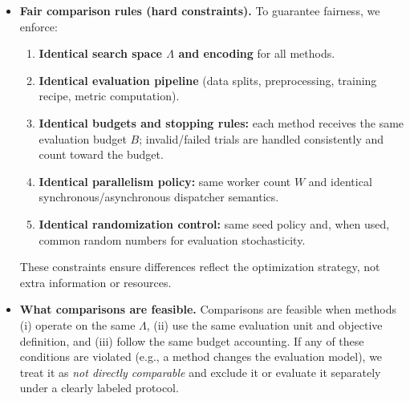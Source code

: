 \begin{itemize}
    \item \textbf{Fair comparison rules (hard constraints).}
    To guarantee fairness, we enforce:
    \begin{enumerate}
        \item \textbf{Identical search space \(\Lambda\) and encoding} for all methods.
        \item \textbf{Identical evaluation pipeline} (data splits, preprocessing, training recipe, metric computation).
        \item \textbf{Identical budgets and stopping rules:} each method receives the same evaluation budget \(B\);
        invalid/failed trials are handled consistently and count toward the budget.
        \item \textbf{Identical parallelism policy:} same worker count \(W\) and identical synchronous/asynchronous dispatcher semantics.
        \item \textbf{Identical randomization control:} same seed policy and, when used, common random numbers for evaluation stochasticity.
    \end{enumerate}
    These constraints ensure differences reflect the optimization strategy, not extra information or resources.

    \item \textbf{What comparisons are feasible.}
    Comparisons are feasible when methods (i) operate on the same \(\Lambda\), (ii) use the same evaluation unit and objective definition,
    and (iii) follow the same budget accounting.
    If any of these conditions are violated (e.g., a method changes the evaluation model), we treat it as \emph{not directly comparable}
    and exclude it or evaluate it separately under a clearly labeled protocol.
\end{itemize}
